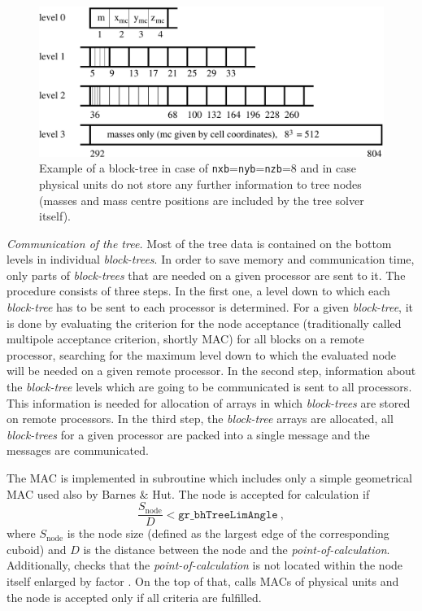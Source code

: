 \begin{figure}[h]
\includegraphics[width=15cm]{tree-in-ram}
\caption{Example of a {block-tree} in case of
\texttt{nxb}=\texttt{nyb}=\texttt{nzb}=8 and in case physical units do not
store any further information to tree nodes (masses and mass centre positions
are included by the tree solver itself).}
\label{fig:btree}
\end{figure}

\textit{Communication of the tree.} Most of the tree data is contained on the
bottom levels in individual {\em block-trees}. In order to save memory and
communication time, only parts of {\em block-trees} that are needed on a given
processor are sent to it. The procedure consists of three steps. In the first
one, a level down to which each {\em block-tree} has to be sent to each
processor is determined. For a given {\em block-tree}, it is done by evaluating
the criterion for the node acceptance (traditionally called multipole acceptance
criterion, shortly MAC) for all blocks on a remote processor, searching for the
maximum level down to which the evaluated node will be needed on a given remote
processor. In the second step, information about the {\em block-tree}
levels which are going to be communicated is sent to all processors. This
information is needed for allocation of arrays in which {\em block-trees} are
stored on remote processors. In the third step, the {\em block-tree} arrays are
allocated, all {\em block-trees} for a given processor are packed into a single
message and the messages are communicated.

The MAC is implemented in subroutine  which includes only a
simple geometrical MAC used also by Barnes \& Hut. The node is accepted for
calculation if
\begin{equation}
\label{eq:stl}
\frac{S_\mathrm{node}}{D} < \mathtt{gr\_bhTreeLimAngle} \ ,
\end{equation}
where $S_\mathrm{node}$ is the node size (defined as the largest edge of the
corresponding cuboid) and $D$ is the distance between the node and the {\em
point-of-calculation}. Additionally,  checks that the {\em
point-of-calculation} is not located within the node itself enlarged by factor
. On the top of that,  calls MACs of 
physical units and the node is accepted only if all criteria are fulfilled.

